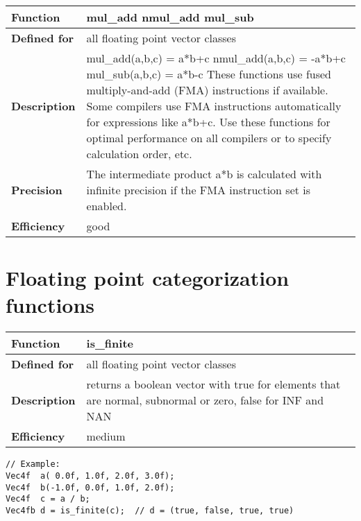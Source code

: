 \documentclass[vcl_manual.tex]{subfiles}
\begin{document}
\begin{tabular}{|p{25mm}|p{100mm}|}
\hline
\bfseries Function & mul\_add \newline
nmul\_add \newline
mul\_sub \\ \hline
\bfseries Defined for & all floating point vector classes \\ \hline
\bfseries Description & mul\_add(a,b,c) = a*b+c \newline
nmul\_add(a,b,c) = -a*b+c \newline
mul\_sub(a,b,c) = a*b-c \newline
These functions use fused multiply-and-add (FMA) instructions if available. Some compilers use FMA instructions automatically for expressions like a*b+c. Use these functions for optimal performance on all compilers or to specify calculation order, etc. \\ \hline
\bfseries Precision & The intermediate product a*b is calculated with infinite precision if the FMA instruction set is enabled. \\ \hline
\bfseries Efficiency & good \\ \hline
\end{tabular}


\section{Floating point categorization functions}\label{FloatingPointCategorizationFunctions}

\begin{tabular}{|p{25mm}|p{100mm}|}
\hline
\bfseries Function & is\_finite \\ \hline
\bfseries Defined for & all floating point vector classes \\ \hline
\bfseries Description & returns a boolean vector with true for elements that are normal, subnormal or zero, false for INF and NAN \\ \hline
\bfseries Efficiency & medium \\ \hline
\end{tabular}
\begin{lstlisting}[frame=none]
// Example:
Vec4f  a( 0.0f, 1.0f, 2.0f, 3.0f);
Vec4f  b(-1.0f, 0.0f, 1.0f, 2.0f);
Vec4f  c = a / b;
Vec4fb d = is_finite(c);  // d = (true, false, true, true)
\end{lstlisting}
\end{document}
